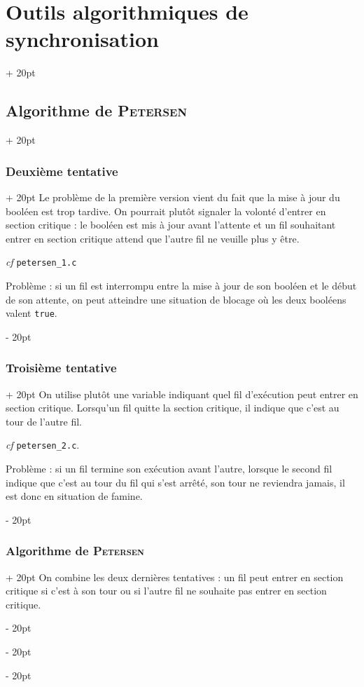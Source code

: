 \documentclass[a4paper, 12pt, twoside]{article}
\newcommand{\ind}[1][20pt]{\advance\leftskip + #1}
\newcommand{\deind}[1][20pt]{\advance\leftskip - #1}
\newenvironment{indt}[2][20pt]{#2 \par \ind[#1]}{\par \deind} %
\begin{document}
\begin{indt}{\section{Outils algorithmiques de synchronisation}}
\begin{indt}{\subsection{Algorithme de \textsc{Petersen}}}
            \vspace{12pt}
            
            \begin{indt}{\subsubsection{Deuxième tentative}}
                Le problème de la première version vient du fait que la mise à jour du booléen est trop tardive. On pourrait plutôt signaler la volonté d'entrer en section critique : le booléen est mis à jour avant l'attente et un fil souhaitant entrer en section critique attend que l'autre fil ne veuille plus y être.

                \textit{cf} \texttt{petersen\_1.c}

                \vspace{6pt}
                
                Problème : si un fil est interrompu entre la mise à jour de son booléen et le début de son attente, on peut atteindre une situation de blocage où les deux booléens valent \texttt{true}.
            \end{indt}

            \vspace{12pt}
            
            \begin{indt}{\subsubsection{Troisième tentative}}
                On utilise plutôt une variable indiquant quel fil d'exécution peut entrer en section critique.
                Lorsqu'un fil quitte la section critique, il indique que c'est au tour de l'autre fil.

                \textit{cf} \texttt{petersen\_2.c}.

                \vspace{6pt}
                
                Problème : si un fil termine son exécution avant l'autre, lorsque le second fil indique que c'est au tour du fil qui s'est arrêté, son tour ne reviendra jamais, il est donc en situation de famine.
            \end{indt}

            \vspace{12pt}
            
            \begin{indt}{\subsubsection{Algorithme de \textsc{Petersen}}}
                On combine les deux dernières tentatives : un fil peut entrer en section critique si c'est à son tour ou si l'autre fil ne souhaite pas entrer en section critique.


\end{indt}
\end{indt}
\end{indt}
\end{document}
